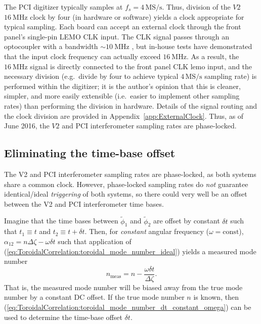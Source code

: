 The PCI digitizer typically samples at $f_s = 4 \, \text{MS/s}$.
Thus, division of the $V2$ $\SI{16}{\mega\hertz}$ clock by four
(in hardware or software) yields a clock appropriate for typical sampling.
Each board can accept an external clock
through the front panel's single-pin LEMO CLK input.
The CLK signal passes through an optocoupler
with a bandwidth $\sim \SI{10}{\mega\hertz}$
\cite{milne_optocoupler_pc16}, but
in-house tests have demonstrated
that the input clock frequency
can actually exceed $\SI{16}{\mega\hertz}$.
As a result, the $\SI{16}{\mega\hertz}$ signal
is directly connected to the front panel CLK lemo input, and
the necessary division
(e.g.\ divide by four to achieve typical $4 \, \text{MS/s}$ sampling rate)
is performed within the digitizer;
it is the author's opinion that
this is cleaner, simpler, and more easily extensible
(i.e.\ easier to implement other sampling rates)
than performing the division in hardware.
Details of the signal routing and the clock division
are provided in Appendix~\ref{app:ExternalClock}.
Thus, as of June 2016,
the $V2$ and PCI interferometer sampling rates
are phase-locked.


\subsection{Eliminating the time-base offset}
The V2 and PCI interferometer sampling rates are phase-locked,
as both systems share a common clock.
However, phase-locked sampling rates do \emph{not} guarantee
identical/ideal \emph{triggering} of both systems, so
there could very well be an offset between the
V2 and PCI interferometer time bases.

Imagine that the time bases between $\tilde{\phi}_1$ and $\tilde{\phi}_2$
are offset by constant $\delta t$ such that
$t_1 \equiv t$ and $t_2 \equiv t + \delta t$.
Then, for \emph{constant} angular frequency ($\omega = \text{const}$),
$\alpha_{12} = n \Delta \zeta - \omega \delta t$
such that application of
(\ref{eq:ToroidalCorrelation:toroidal_mode_number_ideal})
yields a measured mode number
\begin{equation}
  n_{\text{meas}} = n - \frac{\omega \delta t}{\Delta \zeta}.
  \label{eq:ToroidalCorrelation:toroidal_mode_number_dt_constant_omega}
\end{equation}
That is, the measured mode number will be biased away from
the true mode number by a constant DC offset.
If the true mode number $n$ is known,
then (\ref{eq:ToroidalCorrelation:toroidal_mode_number_dt_constant_omega})
can be used to determine the time-base offset $\delta t$.

